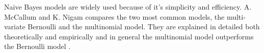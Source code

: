 	Naive Bayes models are widely used because of it's simplicity and efficiency. A. McCallum and K. Nigam compares the two most common models, the multi-variate Bernoulli and the multinomial model. They are explained in detailed both theoretically and empirically and in general the multinomial model outperforms the Bernoulli model \cite{Zhang04optimality}.